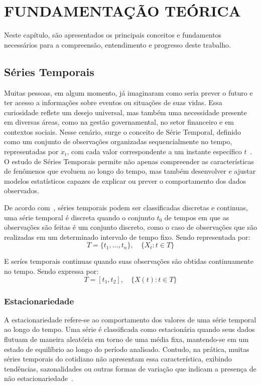 \chapter{FUNDAMENTAÇÃO TEÓRICA}
Neste capítulo, são apresentados os principais conceitos e fundamentos necessários para a compreensão, 
entendimento e progresso deste trabalho.

\section{Séries Temporais}
    Muitas pessoas, em algum momento, já imaginaram como seria prever o futuro e ter acesso a informações sobre eventos 
    ou situações de suas vidas. Essa curiosidade reflete um desejo universal, mas também uma necessidade presente em 
    diversas áreas, como na gestão governamental, no setor financeiro e em contextos sociais. Nesse cenário, surge o 
    conceito de Série Temporal, definido como um conjunto de observações organizadas sequencialmente no tempo, 
    representadas por \( x_t \), com cada valor correspondente a um instante específico \(t\)~\cite{box2015}. O estudo de 
    Séries Temporais permite não apenas compreender as características de fenômenos que evoluem ao longo do tempo, mas 
    também desenvolver e ajustar modelos estatísticos capazes de explicar ou prever o comportamento dos dados 
    observados.
    
    De acordo com~, séries temporais podem ser classificadas 
    discretas e continuas, uma série temporal é discreta quando o conjunto \( t_0 \) de tempos em que as observações 
    são feitas é um conjunto discreto, como o caso de observações que são realizadas em um determinado intervalo de 
    tempo fixo. Sendo representada por:
    \begin{equation}
        T = \{t_1, \dots, t_n\}, \quad \{X_t : t \in T\}
    \end{equation}
    
    
    E seríes temporais continuas quando suas observações são obtidas continuamente no tempo. Sendo expressa por: 
    \begin{equation}
        T = [t_1, t_2], \quad \{X(t) : t \in T\}
    \end{equation}
        
    \subsection{Estacionariedade}
        A estacionariedade refere-se ao comportamento dos valores de uma série temporal ao longo do tempo. Uma série é 
        classificada como estacionária quando seus dados flutuam de maneira aleatória em torno de uma média fixa, mantendo-se em 
        um estado de equilíbrio ao longo do período analisado. Contudo, na prática, muitas séries temporais do cotidiano não 
        apresentam essa característica, exibindo tendências, sazonalidades ou outras formas de variação que indicam a presença de 
        não estacionariedade~\cite{morettin2018}.

